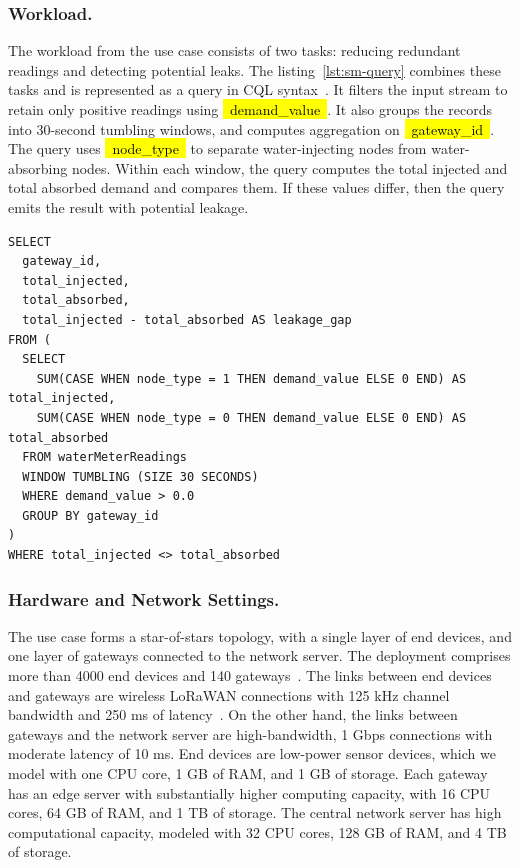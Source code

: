 \documentclass[runningheads]{llncs}
\newcommand*{\codebox}[1]{{\ttfamily\hyphenchar\font=45\relax\hl{~#1~}}}
\begin{document}
\subsubsection{Workload.}
The workload from the use case consists of two tasks: reducing redundant readings and detecting potential leaks.
The listing~\ref{lst:sm-query} combines these tasks and is represented as a query in CQL syntax~\cite{cql}.
It filters the input stream to retain only positive readings using \codebox{demand_value}.
It also groups the records into 30-second tumbling windows, and computes aggregation on \codebox{gateway_id}.
The query uses \codebox{node_type} to separate water-injecting nodes from water-absorbing nodes.
Within each window, the query computes the total injected and total absorbed demand and compares them.
If these values differ, then the query emits the result with potential leakage.

\begin{lstlisting}[style=sqlstyle, frame=single, caption={Smart Water Metering Query}]
SELECT
  gateway_id,
  total_injected,
  total_absorbed,
  total_injected - total_absorbed AS leakage_gap
FROM (
  SELECT
    SUM(CASE WHEN node_type = 1 THEN demand_value ELSE 0 END) AS total_injected,
    SUM(CASE WHEN node_type = 0 THEN demand_value ELSE 0 END) AS total_absorbed
  FROM waterMeterReadings
  WINDOW TUMBLING (SIZE 30 SECONDS)
  WHERE demand_value > 0.0
  GROUP BY gateway_id
)
WHERE total_injected <> total_absorbed
\end{lstlisting}\label{lst:sm-query}

\subsubsection{Hardware and Network Settings.}
The use case forms a star-of-stars topology, with a single layer of end devices, and one layer of gateways connected to the network server. 
The deployment comprises more than 4000 end devices and 140 gateways~\cite{domenico2023}. 
The links between end devices and gateways are wireless LoRaWAN connections with 125 kHz channel bandwidth and 250 ms of latency~\cite{lorawan}. 
On the other hand, the links between gateways and the network server are high-bandwidth, 1 Gbps connections with moderate latency of 10 ms. 
End devices are low-power sensor devices, which we model with one CPU core, 1 GB of RAM, and 1 GB of storage. %
Each gateway has an edge server with substantially higher computing capacity, with 16 CPU cores, 64 GB of RAM, and 1 TB of storage. 
The central network server has high computational capacity, modeled with 32 CPU cores, 128 GB of RAM, and 4 TB of storage. 
\end{document}
